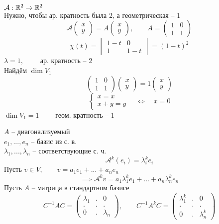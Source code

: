 \begin{eg}
	$ \mathcal{A} : \mathbb{R}^2 \to \mathbb{R}^2 $ \\
	Нужно, чтобы ар. кратность была 2, а геометрическая -- 1
	$$ \mathcal{A}
	\begin{pmatrix}
		x \\
		y
	\end{pmatrix} = A
	\begin{pmatrix}
		x \\
		y
	\end{pmatrix}, \qquad A =
	\begin{pmatrix}
		1 & 0 \\
		1 & 1
	\end{pmatrix} $$
	$$ \chi(t) =
	\begin{vmatrix}
		1 - t & 0 \\
		1 & 1 - t
	\end{vmatrix} = (1 - t)^2 $$
	$ \lambda = 1, \qquad $ ар. кратность -- 2 \\
	Найдём $ \dim V_1 $
	$$
	\begin{pmatrix}
		1 & 0 \\
		1 & 1
	\end{pmatrix}
	\begin{pmatrix}
		x \\
		y
	\end{pmatrix} = 1
	\begin{pmatrix}
		x \\
		y
	\end{pmatrix} $$
	$$
	\begin{cases}
		x = x \\
		x + y = y
	\end{cases} \quad \iff \quad x = 0 $$
	$ \dim V_1 = 1 \qquad $ геом. кратность -- 1
\end{eg}

\begin{remark}
	$ A $ -- диагонализуемый \\
	$ e_1, ..., e_n $ -- базис из с. в. \\
	$ \lambda_1, ..., \lambda_n $ -- соответствующие с. ч.
	$$ \mathcal{A}^k(e_i) = \lambda_i^ke_i $$
	Пусть $ v \in V, \qquad v = a_1e_1 + ... + a_ne_n $
	$$ \implies \mathcal{A}^kv = a_1\lambda_1^ke_1 + ... + a_n\lambda_n^ke_n $$
	Пусть $ A $ -- матрица в стандартном базисе
	$$ C^{-1}AC =
	\begin{pmatrix}
		\lambda_1 & . & 0 \\
		. & . & . \\
		0 & . & \lambda_n
	\end{pmatrix}, \qquad C^{-1}A^kC =
	\begin{pmatrix}
		\lambda_1^k & . & 0 \\
		. & . & . \\
		0 & . & \lambda_n^k
	\end{pmatrix} $$
\end{remark}

